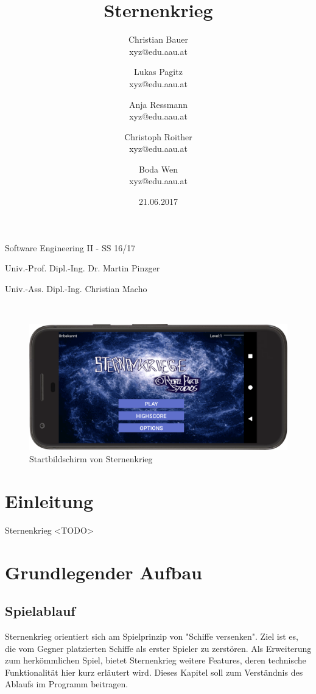 \documentclass[11pt]{article} %
\title{Sternenkrieg}
\author{Christian Bauer\\ xyz@edu.aau.at
\and Lukas Pagitz \\ xyz@edu.aau.at
\and Anja Ressmann \\ xyz@edu.aau.at
\and Christoph Roither \\ xyz@edu.aau.at
\and Boda Wen \\ xyz@edu.aau.at}
\date{21.06.2017}
\begin{document}
\maketitle

\begin{center}
Software Engineering II - SS 16/17

\hfill \break

Univ.-Prof. Dipl.-Ing. Dr. Martin Pinzger

Univ.-Ass. Dipl.-Ing. Christian Macho

\hfill \break
\\[3em]
\begin{figure}[H]
	\centering
 	\includegraphics[width=1\textwidth]{img/main}
	\caption{Startbildschirm von Sternenkrieg}
\end{figure}
\end{center}
\hfill \break
\newpage
\tableofcontents

\newpage

\section{Einleitung}

Sternenkrieg <TODO>

\section{Grundlegender Aufbau}
\subsection{Spielablauf}
Sternenkrieg orientiert sich am Spielprinzip von "Schiffe versenken". Ziel ist es, die vom Gegner platzierten Schiffe als erster Spieler zu zerstören. Als Erweiterung zum herkömmlichen Spiel, bietet Sternenkrieg weitere Features, deren technische Funktionalität hier kurz erläutert wird. Dieses Kapitel soll zum Verständnis des Ablaufs im Programm beitragen.
\end{document}
